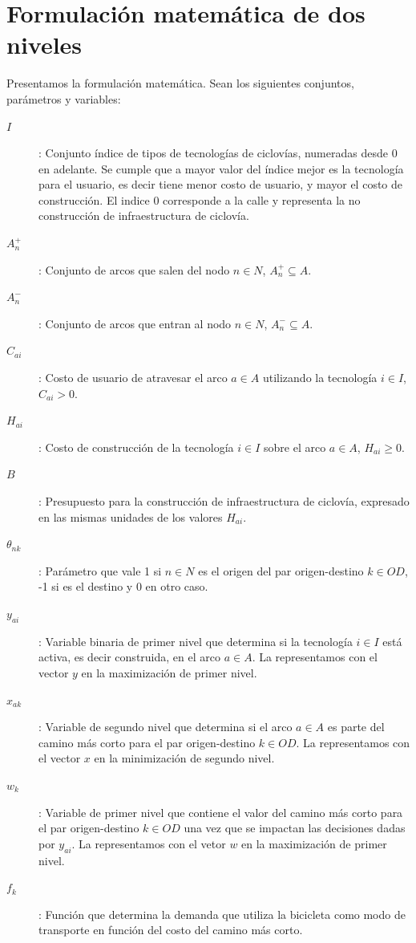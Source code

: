 \FloatBarrier
\clearpage
\section{Formulación matemática de dos niveles}

Presentamos la formulación matemática. Sean los siguientes conjuntos, parámetros y variables:

\begin{description}
  \item[$I$]: Conjunto índice de tipos de tecnologías de ciclovías, numeradas desde $0$ en adelante. Se cumple que a mayor valor del índice mejor es la tecnología para el usuario, es decir tiene menor costo de usuario, y mayor el costo de construcción. El indice 0 corresponde a la calle y representa la no construcción de infraestructura de ciclovía.
  \item[$A_n^+$]: Conjunto de arcos que salen del nodo $n \in N$, $A_n^+ \subseteq A$.
  \item[$A_n^-$]: Conjunto de arcos que entran al nodo $n \in N$, $A_n^- \subseteq A$.
  \item[$C_{ai}$]: Costo de usuario de atravesar el arco $a \in A$ utilizando la tecnología $i \in I$, $C_{ai} > 0$.
  \item[$H_{ai}$]: Costo de construcción de la tecnología $i \in I$ sobre el arco $a \in A$, $H_{ai} \geq 0$.
  \item[$B$]: Presupuesto para la construcción de infraestructura de ciclovía, expresado en las mismas unidades de los valores $H_{ai}$.
  \item[$\theta_{nk}$]: Parámetro que vale 1 si $n \in N$ es el origen del par origen-destino $k \in OD$, -1 si es el destino y 0 en otro caso.
  \item[$y_{ai}$]: Variable binaria de primer nivel que determina si la tecnología $i \in I$ está activa, es decir construida, en el arco $a \in A$. La representamos con el vector $y$ en la maximización de primer nivel.
  \item[$x_{ak}$]: Variable de segundo nivel que determina si el arco $a \in A$ es parte del camino más corto para el par origen-destino $k \in OD$. La representamos con el vector $x$ en la minimización de segundo nivel.
  \item[$w_k$]: Variable de primer nivel que contiene el valor del camino más corto para el par origen-destino $k \in OD$ una vez que se impactan las decisiones dadas por $y_{ai}$. La representamos con el vetor $w$ en la maximización de primer nivel.
  \item[$f_k$]: Función que determina la demanda que utiliza la bicicleta como modo de transporte en función del costo del camino más corto.
\end{description}

